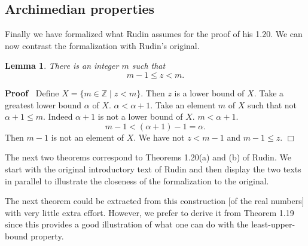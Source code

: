 \documentclass{article}
\newenvironment{forthel}{\begin{leftbar}}{\end{leftbar}}
\newenvironment{proof}{\noindent\textbf{Proof\ }}{\hspace*{\fill}$\Box$\medskip}
\newtheorem{lemma}{Lemma}
\newcommand{\ZZ}{\mathbb{Z}}
\begin{document}
\subsection{Archimedian properties}
Finally we have formalized what Rudin assumes for the proof of his 1.20. We can now contrast the formalization with Rudin's original.
\begin{forthel}
\begin{lemma} There is an integer $m$ such that
$$m - 1 \leq z < m.$$ \end{lemma}
\begin{proof} 
Define $X = \{ m \in \ZZ \mid z < m\}$.
Then $z$ is a lower bound of $X$.
Take a greatest lower bound $\alpha$ of $X$.
$\alpha < \alpha + 1$.
Take an element $m$ of $X$ such that not $\alpha + 1 \leq m$.
Indeed $\alpha + 1$ is not a lower bound of $X$.
$m < \alpha + 1$. 
$$m - 1 < (\alpha + 1) - 1 = \alpha.$$
Then $m - 1$ is not an element of $X$. 
We have not $z < m-1$ and $m-1 \leq z$.
\end{proof} 
\end{forthel}
\newpage
The next two theorems correspond to Theorems 1.20(a) and (b) of Rudin. We start with the original introductory text of Rudin and then display the two texts in parallel to illustrate the closeness of the formalization to the original.

\vspace{1cm}

The next theorem could be extracted from this construction [of the real numbers] with very little extra effort. However, we prefer to derive it from Theorem 1.19 since this provides a good illustration of what one can do with the least-upper-bound property.
\end{document}
